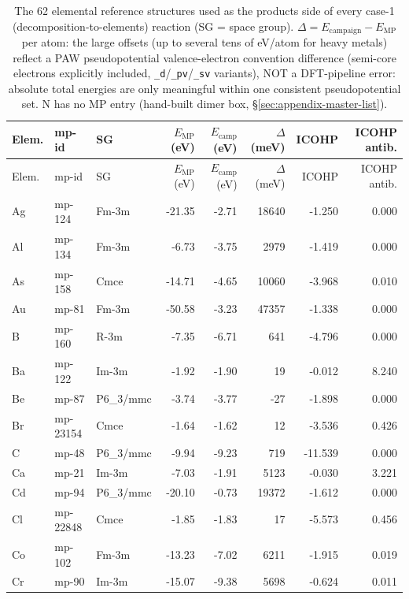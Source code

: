 \begin{longtable}{@{}ll l@{\hspace{4pt}} rrrrr@{}}
\caption{The 62 elemental reference structures used as the products side of every case-1 (decomposition-to-elements) reaction (SG = space group). $\Delta = E_\text{campaign} - E_\text{MP}$ per atom: the large offsets (up to several tens of eV/atom for heavy metals) reflect a PAW pseudopotential valence-electron convention difference (semi-core electrons explicitly included, \texttt{\_d}/\texttt{\_pv}/\texttt{\_sv} variants), NOT a DFT-pipeline error: absolute total energies are only meaningful within one consistent pseudopotential set. N has no MP entry (hand-built dimer box, \S\ref{sec:appendix-master-list}).}\\
\toprule
Elem. & mp-id & SG & $E_\text{MP}$ (eV) & $E_\text{camp}$ (eV) & $\Delta$ (meV) & ICOHP & ICOHP antib. \\
\midrule
\endfirsthead
\toprule
Elem. & mp-id & SG & $E_\text{MP}$ (eV) & $E_\text{camp}$ (eV) & $\Delta$ (meV) & ICOHP & ICOHP antib. \\
\midrule
\endhead
\bottomrule
\endfoot
\bottomrule
\endlastfoot
Ag & mp-124 & Fm-3m & -21.35 & -2.71 & 18640 & -1.250 & 0.000 \\
Al & mp-134 & Fm-3m & -6.73 & -3.75 & 2979 & -1.419 & 0.000 \\
As & mp-158 & Cmce & -14.71 & -4.65 & 10060 & -3.968 & 0.010 \\
Au & mp-81 & Fm-3m & -50.58 & -3.23 & 47357 & -1.338 & 0.000 \\
B & mp-160 & R-3m & -7.35 & -6.71 & 641 & -4.796 & 0.000 \\
Ba & mp-122 & Im-3m & -1.92 & -1.90 & 19 & -0.012 & 8.240 \\
Be & mp-87 & P6_3/mmc & -3.74 & -3.77 & -27 & -1.898 & 0.000 \\
Br & mp-23154 & Cmce & -1.64 & -1.62 & 12 & -3.536 & 0.426 \\
C & mp-48 & P6_3/mmc & -9.94 & -9.23 & 719 & -11.539 & 0.000 \\
Ca & mp-21 & Im-3m & -7.03 & -1.91 & 5123 & -0.030 & 3.221 \\
Cd & mp-94 & P6_3/mmc & -20.10 & -0.73 & 19372 & -1.612 & 0.000 \\
Cl & mp-22848 & Cmce & -1.85 & -1.83 & 17 & -5.573 & 0.456 \\
Co & mp-102 & Fm-3m & -13.23 & -7.02 & 6211 & -1.915 & 0.019 \\
Cr & mp-90 & Im-3m & -15.07 & -9.38 & 5698 & -0.624 & 0.011 \\

\end{longtable}
